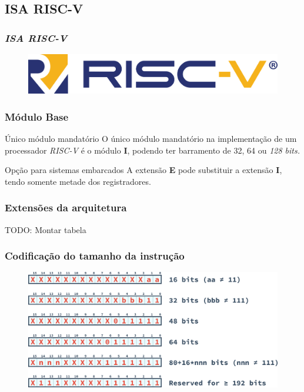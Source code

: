 \documentclass[aspectratio=169]{beamer}
\begin{document}
    \subsection{ISA RISC-V}
    \begin{frame}
        \vfill
        \frametitle{\textit{\textbf{ISA RISC-V}}}
        \begin{figure}[H]
        \centering
            \includegraphics[width=.9\textwidth,height=.9\textheight,keepaspectratio]
            {../images/riscv_logo.png}
        \end{figure}
        \vfill
    \end{frame}

    \begin{frame}
        \frametitle{Módulo Base}
        \vfill
        \begin{block}{Único módulo mandatório}
            { O único módulo mandatório na implementação de um processador \textit{RISC-V}
                é o módulo \textbf{I}, podendo ter barramento de 32, 64 ou \textit{128 bits.}
            }
        \end{block}
        \vfill
        \begin{exampleblock}{Opção para sistemas embarcados}
            { A extensão \textbf{E} pode substituir a extensão \textbf{I}, tendo somente metade
                dos registradores.
            }
        \end{exampleblock}
        \vfill
    \end{frame}

    \begin{frame}
        \frametitle{Extensões da arquitetura}
        \vfill
        {TODO: Montar tabela}
        \vfill
    \end{frame}

    \begin{frame}
        \frametitle{Codificação do tamanho da instrução}
        \vfill
        \begin{figure}[H]
        \centering
            \includegraphics[width=.9\textwidth,height=.9\textheight,keepaspectratio]
            {../images/instructions/rv_encoding.png}
        \end{figure}
        \vfill
    \end{frame}
\end{document}
